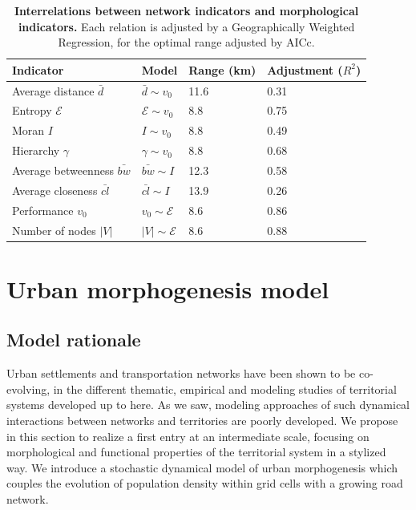 \begin{table}
\caption{\textbf{Interrelations between network indicators and morphological indicators.} Each relation is adjusted by a Geographically Weighted Regression, for the optimal range adjusted by AICc.\label{tab:staticcorrelations:gwr}}
\begin{center}
\begin{tabular}{|l|l|l|l|}
\hline
Indicator & Model & Range (km) & Adjustment ($R^2$) \\ \hline
Average distance $\bar{d}$ & $\bar{d} \sim v_0$ & 11.6 & 0.31 \\
Entropy $\mathcal{E}$  & $\mathcal{E} \sim v_0$ &  8.8  &0.75 \\
Moran $I$ & $I \sim v_0$ & 8.8 & 0.49 \\
Hierarchy $\gamma$ & $\gamma \sim v_0$ & 8.8  & 0.68 \\\hline
Average betweenness $\bar{bw}$ & $\bar{bw} \sim I$ & 12.3 & 0.58 \\
Average closeness $\bar{cl}$ & $\bar{cl}\sim I$ & 13.9 & 0.26 \\
Performance $v_0$ & $v_0 \sim \mathcal{E}$ & 8.6  & 0.86 \\
Number of nodes $\left|V\right|$ & $\left|V\right| \sim \mathcal{E}$ & 8.6  & 0.88 \\\hline
\end{tabular}
\end{center}
\end{table}







\section{Urban morphogenesis model}


\subsection{Model rationale}



Urban settlements and transportation networks have been shown to be co-evolving, in the different thematic, empirical  and modeling studies of territorial systems developed up to here. As we saw, modeling approaches of such dynamical interactions between networks and territories are poorly developed. We propose in this section to realize a first entry at an intermediate scale, focusing on morphological and functional properties of the territorial system in a stylized way. We introduce a stochastic dynamical model of urban morphogenesis which couples the evolution of population density within grid cells with a growing road network.


